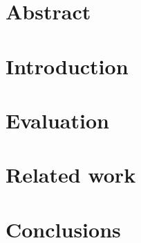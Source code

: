 \documentclass[12pt,a4paper]{report}
\begin{document}


\maketitle
\tableofcontents

\chapter{Abstract}


\chapter{Introduction}








\chapter{Evaluation}


\chapter{Related work}


\chapter{Conclusions}


\printglossaries



\end{document}
